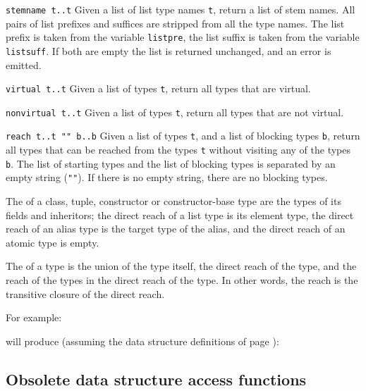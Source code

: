 \begin{desctab}
\item[\texttt{stemname t..t}]
Given a list of list type names \texttt{t},
return a list of stem names.
All pairs of list prefixes and suffices are stripped from all
the type names.
The list prefix is taken from the variable \verb+listpre+,
the list suffix is taken from the variable \verb+listsuff+.
If both are empty the list is returned unchanged, and an error
is emitted.

\item[\texttt{virtual t..t}]
Given a list of types \texttt{t}, return all types that are virtual.

\item[\texttt{nonvirtual t..t}]
Given a list of types \texttt{t}, return all types that are not virtual.

\item[\texttt{reach t..t "" b..b}]
Given a list of types \texttt{t}, and a list of blocking types \texttt{b},
return all types that can be reached from
the types \texttt{t} without visiting any of the types \texttt{b}.
The list of starting types and the list of blocking types is separated
by an empty string (\texttt{""}). If there is no empty string, there are
no blocking types.

The  of a class, tuple, constructor
or constructor-base type are the types of its fields and inheritors;
the direct reach of a list type is its element type, the direct reach
of an alias type is the target type of the alias, and the direct reach
of an atomic type is empty.

The  of a type is the union of the type itself, the direct
reach of the type, and the reach of the types in the direct reach of
the type.  In other words, the reach is the transitive closure of the
direct reach.

\end{desctab}
For example:
\begin{showfile}

\end{showfile}
will produce (assuming the data structure definitions of page \pageref{plotds}):
\begin{showfile}

\end{showfile}

\subsection{Obsolete data structure access functions}

